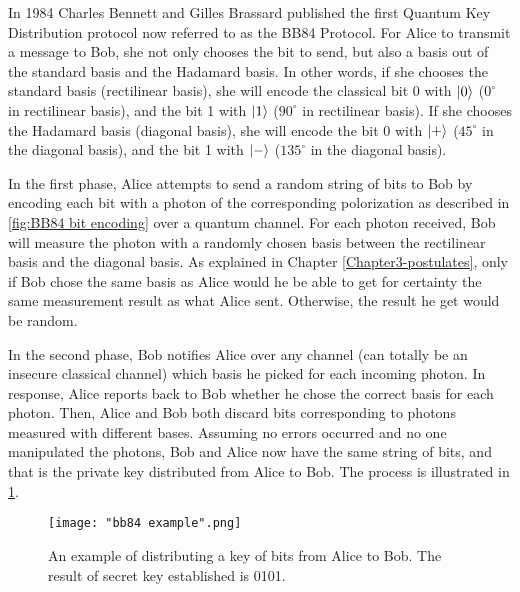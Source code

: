 In 1984 Charles Bennett and Gilles Brassard published the first Quantum Key Distribution protocol \cite{Bennett1984} now referred to as the BB84 Protocol. For Alice to transmit a message to Bob, she not only chooses the bit to send, but also a basis out of the standard basis and the Hadamard basis. In other words, if she chooses the standard basis (rectilinear basis), she will encode the classical bit 0 with $\ket{0}$ ($0^\circ$ in rectilinear basis), and the bit 1 with $\ket{1}$ ($90^\circ$ in rectilinear basis). If she chooses the Hadamard basis (diagonal basis), she will encode the bit 0 with $\ket{+}$ ($45^\circ$ in the diagonal basis), and the bit 1 with $\ket{-}$ ($135^\circ$ in the diagonal basis). 

In the first phase, Alice attempts to send a random string of bits to Bob by encoding each bit with a photon of the corresponding polorization as described in \ref{fig:BB84 bit encoding} over a quantum channel. For each photon received, Bob will measure the photon with a randomly chosen basis between the rectilinear basis and the diagonal basis. As explained in Chapter \ref{Chapter3-postulates}, only if Bob chose the same basis as Alice would he be able to get for certainty the same measurement result as what Alice sent. Otherwise, the result he get would be random.

In the second phase, Bob notifies Alice over any channel (can totally be an insecure classical channel) which basis he picked for each incoming photon. In response, Alice reports back to Bob whether he chose the correct basis for each photon. Then, Alice and Bob both discard bits corresponding to photons measured with different bases. Assuming no errors occurred and no one manipulated the photons, Bob and Alice now have the same string of bits, and that is the private key distributed from Alice to Bob. The process is illustrated in \ref{fig:BB84 bit example}.

\begin{figure}[h]
    \centering
    \texttt{[image: "bb84 example".png]}
    \caption{An example of distributing a key of bits from Alice to Bob. The result of secret key established is 0101.\protect\footnotemark}
    \label{fig:BB84 bit example}
\end{figure}

